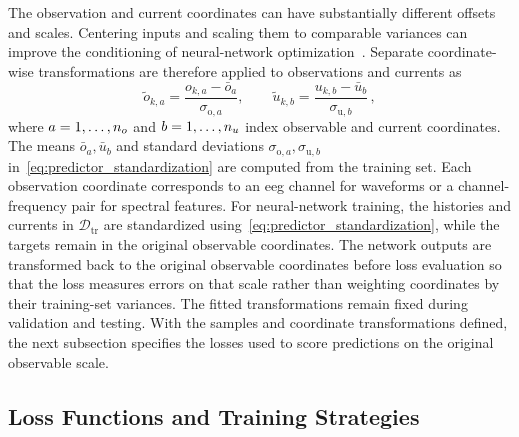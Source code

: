 The observation and current coordinates can have substantially different offsets and scales.
Centering inputs and scaling them to comparable variances can improve the conditioning of neural-network optimization~\cite{LeCun1998}.
Separate coordinate-wise transformations are therefore applied to observations and currents as
\begin{equation}
    \widetilde{o}_{k,a}
    = \frac{o_{k,a}-\bar{o}_a}{\sigma_{\mathrm{o},a}},
    \qquad
    \widetilde{u}_{k,b}
    = \frac{u_{k,b}-\bar{u}_b}{\sigma_{\mathrm{u},b}}\,,
    \label{eq:predictor_standardization}
\end{equation}
where $a=1,\ldots,n_{o}$ and $b=1,\ldots,n_{u}$ index observable and current coordinates.
The means $\bar{o}_a,\bar{u}_b$ and standard deviations $\sigma_{\mathrm{o},a},\sigma_{\mathrm{u},b}$ in~\eqref{eq:predictor_standardization} are computed from the training set.
Each observation coordinate corresponds to an \ac{eeg} channel for waveforms or a channel-frequency pair for spectral features.
For neural-network training, the histories and currents in $\mathcal D_{\mathrm{tr}}$ are standardized using~\eqref{eq:predictor_standardization}, while the targets remain in the original observable coordinates.
The network outputs are transformed back to the original observable coordinates before loss evaluation so that the loss measures errors on that scale rather than weighting coordinates by their training-set variances.
The fitted transformations remain fixed during validation and testing.
With the samples and coordinate transformations defined, the next subsection specifies the losses used to score predictions on the original observable scale.

\subsection{Loss Functions and Training Strategies}

